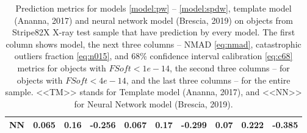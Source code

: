\documentclass[fleqn,usenatbib]{mnras}
\begin{document}
\begin{table}
\begin{tabular}{llllllllll}
            NN             &                             0.065 &            0.16 &           -0.256 &                             0.067 &            0.17 &           -0.299 &                             0.07 &           0.222 &          -0.385 \\
            \hline
            \end{tabular}
            \caption{Prediction metrics for models \ref{model:pw} -- \ref{model:spdw}, template model (Ananna, 2017) and neural network model (Brescia, 2019) on objects from Stripe82X X-ray test sample that have prediction by every model. The first column shows model, the next three columns -- NMAD \eqref{eq:nmad}, catastrophic outliers fraction \eqref{eq:n015}, and 68\% confidence interval calibration \eqref{eq:c68} metrics for objects with $FSoft < 1e-14$, the second three columns -- for objects with $FSoft < 4e-14$, and the last three columns -- for the entire sample. <<TM>> stands for Template model (Ananna, 2017), and <<NN>> for Neural Network model (Brescia, 2019).}
            \label{tab:stripe82x-intersection}
\end{table}
\end{document}
